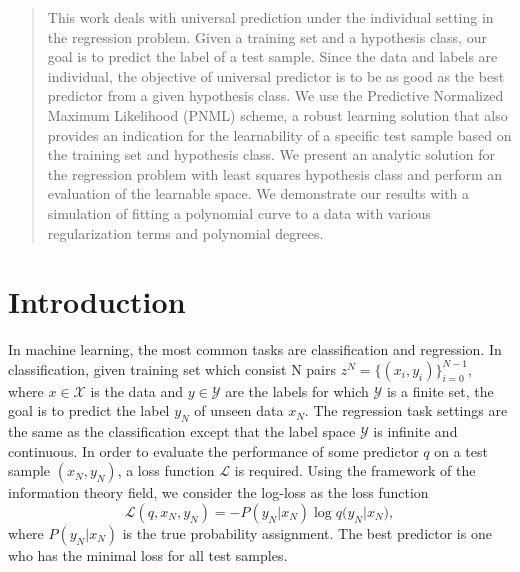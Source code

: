 \documentclass[conference,letterpaper]{IEEEtran}
\begin{document}
\begin{abstract}
This work deals with universal prediction under the individual setting in the regression problem. 
Given a training set and a hypothesis class, our goal is to predict the label of a test sample. 
Since the data and labels are individual, the objective of universal predictor is to be as good as the best predictor from a given hypothesis class. 
We use the Predictive Normalized Maximum Likelihood (PNML) scheme, a robust learning solution that also provides an indication for the learnability of a specific test sample based on the training set and hypothesis class. 
We present an analytic solution for the regression problem with least squares hypothesis class and perform an evaluation of the learnable space. 
We demonstrate our results with a simulation of fitting a polynomial curve to a data with various regularization terms and polynomial degrees.
\end{abstract}


\section{Introduction} \label{Introduction}
In machine learning, the most common tasks are classification and regression. In classification, given training set which consist N pairs $z^N=\{(x_i, y_i)\}_{i=0}^{N-1}$, where $x \in \mathcal{X}$ is the data and $y \in \mathcal{Y}$ are the labels for which $\mathcal{Y}$ is a finite set, the goal is to predict the label $y_N$ of unseen data $x_N$. 
The regression task settings are the same as the classification except that the label space $\mathcal{Y}$ is infinite and continuous.
In order to evaluate the performance of some predictor $q$ on a test sample $(x_N, y_N)$, a loss function  $\mathcal{L}$ is required. Using the framework of the information theory field, we consider the log-loss as the loss function
\begin{equation}
\mathcal{L}(q,x_N,y_N) = -P(y_N|x_N)\log {q(y_N|x_N}),
\end{equation}
where $P(y_N|x_N)$ is the true probability assignment.
The best predictor is one who has the minimal loss for all test samples.
\end{document}
